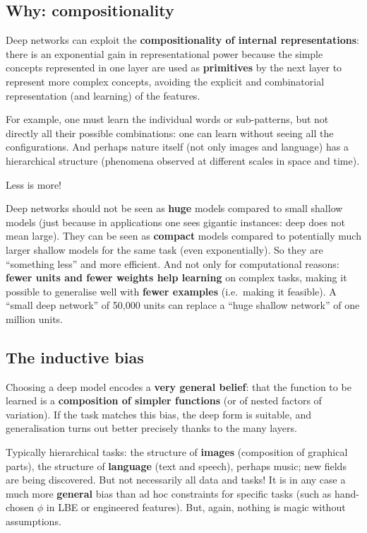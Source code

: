 \subsection{Why: compositionality}\label{perchuxe9-la-composizionalituxe0}

Deep networks can exploit the \textbf{compositionality of internal
representations}: there is an exponential gain in representational
power because the simple concepts represented in one layer are used as
\textbf{primitives} by the next layer to represent more complex
concepts, avoiding the explicit and combinatorial representation (and
learning) of the features.

For example, one must learn the individual words or sub-patterns, but
not directly all their possible combinations: one can learn without
seeing all the configurations. And perhaps nature itself (not only
images and language) has a hierarchical structure (phenomena observed
at different scales in space and time).

\begin{boxtip}{Less is more!}

Deep networks should not be seen as \textbf{huge} models compared to
small shallow models (just because in applications one sees gigantic
instances: deep does not mean large). They can be seen as
\textbf{compact} models compared to potentially much larger shallow
models for the same task (even exponentially). So they are ``something
less'' and more efficient. And not only for computational reasons:
\textbf{fewer units and fewer weights help learning} on complex tasks,
making it possible to generalise well with \textbf{fewer examples}
(i.e.\ making it feasible). A ``small deep network'' of 50,000 units
can replace a ``huge shallow network'' of one million units.

\end{boxtip}

\subsection{The inductive bias}\label{il-bias-induttivo}

Choosing a deep model encodes a \textbf{very general belief}: that the
function to be learned is a \textbf{composition of simpler functions}
(or of nested factors of variation). If the task matches this bias, the
deep form is suitable, and generalisation turns out better precisely
thanks to the many layers.

Typically hierarchical tasks: the structure of \textbf{images}
(composition of graphical parts), the structure of \textbf{language}
(text and speech), perhaps music; new fields are being discovered. But
not necessarily all data and tasks! It is in any case a much more
\textbf{general} bias than ad hoc constraints for specific tasks (such
as hand-chosen \(\phi\) in LBE or engineered features). But, again,
nothing is magic without assumptions.

